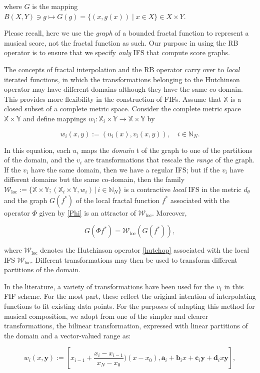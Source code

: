 \documentclass[english,11pt,letterpaper,onecolumn]{scrartcl}
\numberwithin{equation}{section}
\newcommand{\st}{\,|\,}
\newcommand{\N}{\mathbb{N}}
\newcommand{\X}{\mathbb{X}}
\newcommand{\Y}{\mathbb{Y}}
\newcommand{\cW}{\mathcal{W}}
\newcommand{\be}{\begin{equation}}
\newcommand{\ee}{\end{equation}}
\newcommand{\loc}{\mathrm{loc}}
\begin{document}
\noindent where $G$ is the mapping $B(X,Y)\ni g\longmapsto G(g) = \{(x,
g(x))\mid x\in X\}\in X\times Y$.

Please recall, here we use the \textit{graph} of a bounded fractal function to
represent a musical score, not the fractal function as such. Our purpose in
using the RB operator is to ensure that we specify \textit{only} IFS that
compute score graphs.

The concepts of fractal interpolation and the RB operator carry over to
\textit{local} iterated functions, in which the transformations belonging to the
Hutchinson operator may have different domains although they have the same
co-domain. This provides more flexibility in the construction of FIFs. Assume
that $\X$ is a closed subset of a complete metric space. Consider the complete
metric space $\X\times\Y$ and define mappings $w_i:\X_i\times\Y\to\X\times\Y$ by

\be\label{IfsForFif}
w_i (x, y) := (u_i (x), v_i (x,y)), \quad i\in \N_N.
\ee

In this equation, each $u_i$ maps the \emph{domain} t of the graph to one of the
partitions of the domain, and the $v_i$ are transformations that rescale
the \emph{range} of the graph. If the $v_i$ have the same domain, then we have a
regular IFS; but if the $v_i$ have different domains but the same co-domain,
then the family $\cW_\loc := \{\X\times\Y; (\X_i\times\Y, w_i)\st i\in \N_N\}$
is a contractive \textit{local} IFS in the metric $d_\theta$ and the graph
$G(f^*)$ of the local fractal function $f^*$ associated with the operator $\Phi$
given by \eqref{Phi} is an attractor of $\cW_\loc$. Moreover,

\be\label{GW}
G(\Phi f^*) = \cW_\loc (G(f^*)),
\ee

\noindent where $\cW_\loc$ denotes the Hutchinson operator \eqref{hutchop}
associated with the local IFS $\cW_\loc$. Different transformations may then be
used to transform different partitions of the domain.

In the literature, a variety of transformations have been used for the $v_i$ in
this FIF scheme. For the most part, these reflect the original intention of
interpolating functions to fit existing data points. For the purposes of
adapting this method for musical composition, we adopt from
\cite{2012arXiv1209.3139B} one of the simpler and clearer transformations, the
bilinear transformation, expressed with linear partitions of the domain and a
vector-valued range as:

\be\label{bilinear}
w_{i}(x,\mathbf{y}) :=[x_{i-1} + \frac{x_{i}-x_{i-1}}{x_{N}-x_{0}})
(x-x_{0}),\mathbf{a}_i+\mathbf{b}_ix+\mathbf{c}_i\mathbf{y}+\mathbf{d}_ix
\mathbf{y}],
\ee
\end{document}
